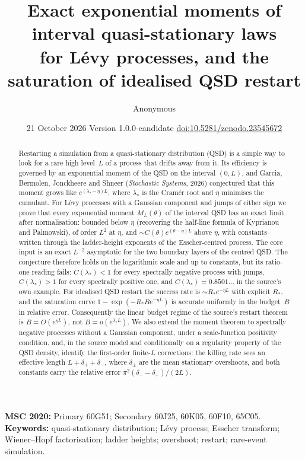 \documentclass[11pt,a4paper]{article}
\title{Exact exponential moments of interval quasi-stationary laws\\ for L\'evy processes, and the saturation of idealised QSD restart}
\author{Anonymous}
\date{21 October 2026 \quad Version 1.0.0-candidate \quad \href{https://doi.org/10.5281/zenodo.23545672}{doi:10.5281/zenodo.23545672}}
\theoremstyle{definition}
\theoremstyle{remark}
\newcommand{\1}{\mathbf 1}
\begin{document}
\maketitle
\begin{abstract}
Restarting a simulation from a quasi-stationary distribution (QSD) is a simple way to look for a rare high level~$L$ of a process that drifts away from it. Its efficiency is governed by an exponential moment of the QSD on the interval $(0,L)$, and Garcia, Bermolen, Jonckheere and Shneer (\emph{Stochastic Systems}, 2026) conjectured that this moment grows like $e^{(\lambda_*-\eta)L}$, where $\lambda_*$ is the Cram\'er root and $\eta$ minimises the cumulant. For L\'evy processes with a Gaussian component and jumps of either sign we prove that every exponential moment $M_L(\theta)$ of the interval QSD has an exact limit after normalisation: bounded below $\eta$ (recovering the half-line formula of Kyprianou and Palmowski), of order $L^2$ at $\eta$, and $\sim C(\theta)e^{(\theta-\eta)L}$ above $\eta$, with constants written through the ladder-height exponents of the Esscher-centred process. The core input is an exact $L^{-2}$ asymptotic for the two boundary layers of the centred QSD. The conjecture therefore holds on the logarithmic scale and up to constants, but its ratio-one reading fails: $C(\lambda_*)<1$ for every spectrally negative process with jumps, $C(\lambda_*)>1$ for every spectrally positive one, and $C(\lambda_*)=0.8501\ldots$ in the source's own example. For idealised QSD restart the success rate is $\sim R_*e^{-\eta L}$ with explicit $R_*$, and the saturation curve $1-\exp(-R_*Be^{-\eta L})$ is accurate uniformly in the budget~$B$ in relative error. Consequently the linear budget regime of the source's restart theorem is $B=O(e^{\eta L})$, not $B=o(e^{\lambda_* L})$. We also extend the moment theorem to spectrally negative processes without a Gaussian component, under a scale-function positivity condition, and, in the source model and conditionally on a regularity property of the QSD density, identify the first-order finite-$L$ corrections: the killing rate sees an effective length $L+\delta_++\delta_-$, where $\delta_\pm$ are the mean stationary overshoots, and both constants carry the relative error $\pi^2(\delta_--\delta_+)/(2L)$.
\end{abstract}

\noindent\textbf{MSC 2020:} Primary 60G51; Secondary 60J25, 60K05, 60F10, 65C05.\\
\textbf{Keywords:} quasi-stationary distribution; L\'evy process; Esscher transform; Wiener--Hopf factorisation; ladder heights; overshoot; restart; rare-event simulation.
\end{document}
